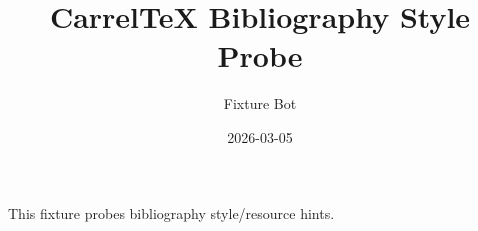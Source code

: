 \documentclass{article}
\title{CarrelTeX Bibliography Style Probe}
\author{Fixture Bot}
\date{2026-03-05}
\begin{document}
\maketitle

This fixture probes bibliography style/resource hints.
\end{document}
